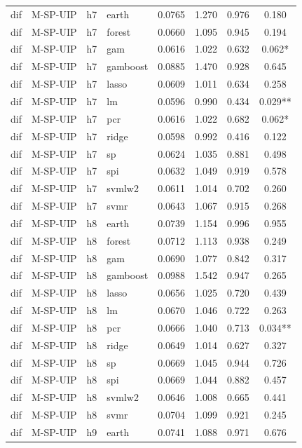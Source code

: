 \begin{ThreePartTable}
\begin{longtable}[t]{llclcccc}
\addlinespace
dif & M-SP-UIP & h7 & earth & 0.0765 & 1.270 & 0.976 & 0.180\\
dif & M-SP-UIP & h7 & forest & 0.0660 & 1.095 & 0.945 & 0.194\\
dif & M-SP-UIP & h7 & gam & 0.0616 & 1.022 & 0.632 & 0.062*\\
dif & M-SP-UIP & h7 & gamboost & 0.0885 & 1.470 & 0.928 & 0.645\\
dif & M-SP-UIP & h7 & lasso & 0.0609 & 1.011 & 0.634 & 0.258\\
dif & M-SP-UIP & h7 & lm & 0.0596 & 0.990 & 0.434 & 0.029**\\
dif & M-SP-UIP & h7 & pcr & 0.0616 & 1.022 & 0.682 & 0.062*\\
dif & M-SP-UIP & h7 & ridge & 0.0598 & 0.992 & 0.416 & 0.122\\
dif & M-SP-UIP & h7 & sp & 0.0624 & 1.035 & 0.881 & 0.498\\
dif & M-SP-UIP & h7 & spi & 0.0632 & 1.049 & 0.919 & 0.578\\
dif & M-SP-UIP & h7 & svmlw2 & 0.0611 & 1.014 & 0.702 & 0.260\\
dif & M-SP-UIP & h7 & svmr & 0.0643 & 1.067 & 0.915 & 0.268\\
\addlinespace
dif & M-SP-UIP & h8 & earth & 0.0739 & 1.154 & 0.996 & 0.955\\
dif & M-SP-UIP & h8 & forest & 0.0712 & 1.113 & 0.938 & 0.249\\
dif & M-SP-UIP & h8 & gam & 0.0690 & 1.077 & 0.842 & 0.317\\
dif & M-SP-UIP & h8 & gamboost & 0.0988 & 1.542 & 0.947 & 0.265\\
dif & M-SP-UIP & h8 & lasso & 0.0656 & 1.025 & 0.720 & 0.439\\
dif & M-SP-UIP & h8 & lm & 0.0670 & 1.046 & 0.722 & 0.263\\
dif & M-SP-UIP & h8 & pcr & 0.0666 & 1.040 & 0.713 & 0.034**\\
dif & M-SP-UIP & h8 & ridge & 0.0649 & 1.014 & 0.627 & 0.327\\
dif & M-SP-UIP & h8 & sp & 0.0669 & 1.045 & 0.944 & 0.726\\
dif & M-SP-UIP & h8 & spi & 0.0669 & 1.044 & 0.882 & 0.457\\
dif & M-SP-UIP & h8 & svmlw2 & 0.0646 & 1.008 & 0.665 & 0.441\\
dif & M-SP-UIP & h8 & svmr & 0.0704 & 1.099 & 0.921 & 0.245\\
\addlinespace
dif & M-SP-UIP & h9 & earth & 0.0741 & 1.088 & 0.971 & 0.676\\

\end{longtable}
\end{ThreePartTable}
